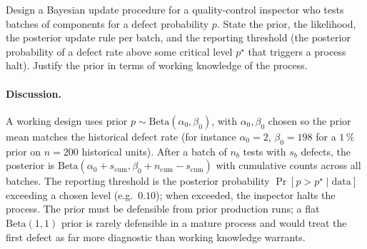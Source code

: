 \begin{exercise}
Design a Bayesian update procedure for a quality-control inspector
who tests batches of components for a defect probability $p$. State
the prior, the likelihood, the posterior update rule per batch,
and the reporting threshold (the posterior probability of a defect
rate above some critical level $p^{\star}$ that triggers a process
halt). Justify the prior in terms of working knowledge of the
process.

\paragraph{Discussion.} A working design uses prior $p \sim
\mathrm{Beta}(\alpha_{0}, \beta_{0})$, with $\alpha_{0}, \beta_{0}$
chosen so the prior mean matches the historical defect rate (for
instance $\alpha_{0} = 2$, $\beta_{0} = 198$ for a $1\,\%$ prior
on $n = 200$ historical units). After a batch of $n_{b}$ tests
with $s_{b}$ defects, the posterior is $\mathrm{Beta}(\alpha_{0}
+ s_{\text{cum}}, \beta_{0} + n_{\text{cum}} - s_{\text{cum}})$
with cumulative counts across all batches. The reporting
threshold is the posterior probability $\Pr[p > p^{\star} \mid
\text{data}]$ exceeding a chosen level (e.g.\ $0.10$); when
exceeded, the inspector halts the process. The prior must be
defensible from prior production runs; a flat $\mathrm{Beta}(1,1)$
prior is rarely defensible in a mature process and would treat
the first defect as far more diagnostic than working knowledge
warrants.
\end{exercise}

